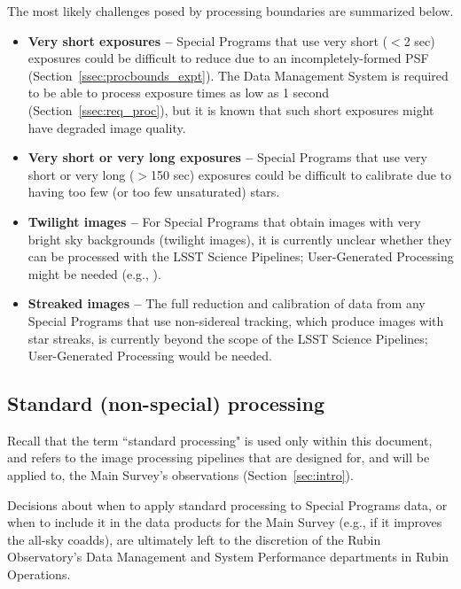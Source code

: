 The most likely challenges posed by processing
boundaries are summarized below.

\begin{itemize}

\item \textbf{Very short exposures --}
Special Programs that use very short ($<$2 sec) exposures 
could be difficult to reduce due to an incompletely-formed PSF 
(Section~\ref{ssec:procbounds_expt}).
The Data Management System is required to be able to process exposure 
times as low as 1 second (Section~\ref{ssec:req_proc}), 
but it is known that such short exposures might have degraded image quality.

\item \textbf{Very short or very long exposures --}
Special Programs that use very short or very long ($>$150 sec) 
exposures could be difficult to calibrate due to having too few 
(or too few unsaturated) stars.

\item \textbf{Twilight images --}
For Special Programs that obtain images with very bright sky backgrounds
(twilight images), it is currently unclear whether they can be processed
with the LSST Science Pipelines; 
User-Generated Processing might be needed (e.g., \citealt{2022AJ....164..168S}).

\item \textbf{Streaked images --}
The full reduction and calibration of data from any Special Programs that 
use non-sidereal tracking, which produce images with star streaks, is
currently beyond the scope of the LSST Science Pipelines; 
User-Generated Processing would be needed.

\end{itemize}

\subsection{Standard (non-special) processing}\label{ssec:proc_reg}

Recall that the term ``standard processing" is used only within this document,
and refers to the image processing pipelines that are designed for, 
and will be applied to, the Main Survey's observations (Section~\ref{sec:intro}).

Decisions about when to apply standard processing to Special Programs data,
or when to include it in the data products for the Main Survey
(e.g., if it improves the all-sky coadds), 
are ultimately left to the discretion of the Rubin Observatory's 
Data Management and System Performance departments in Rubin Operations.


